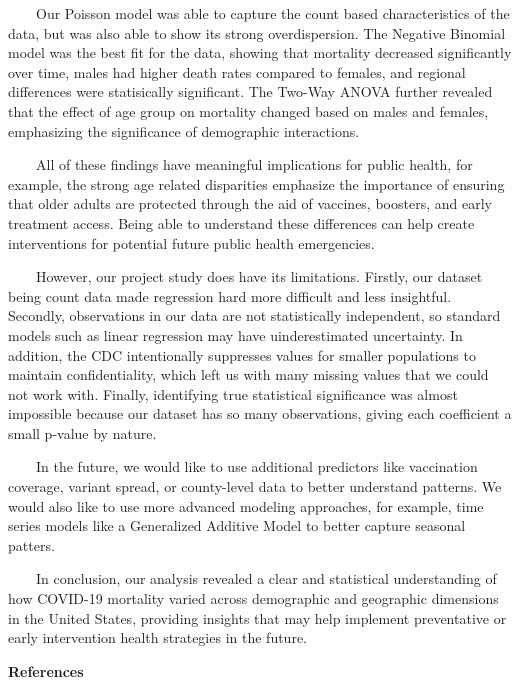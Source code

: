 \documentclass[
]{article}
\begin{document}
~~~~Our Poisson model was able to capture the count based
characteristics of the data, but was also able to show its strong
overdispersion. The Negative Binomial model was the best fit for the
data, showing that mortality decreased significantly over time, males
had higher death rates compared to females, and regional differences
were statisically significant. The Two-Way ANOVA further revealed that
the effect of age group on mortality changed based on males and females,
emphasizing the significance of demographic interactions.

~~~~All of these findings have meaningful implications for public
health, for example, the strong age related disparities emphasize the
importance of ensuring that older adults are protected through the aid
of vaccines, boosters, and early treatment access. Being able to
understand these differences can help create interventions for potential
future public health emergencies.

~~~~However, our project study does have its limitations. Firstly, our
dataset being count data made regression hard more difficult and less
insightful. Secondly, observations in our data are not statistically
independent, so standard models such as linear regression may have
uinderestimated uncertainty. In addition, the CDC intentionally
suppresses values for smaller populations to maintain confidentiality,
which left us with many missing values that we could not work with.
Finally, identifying true statistical significance was almost impossible
because our dataset has so many observations, giving each coefficient a
small p-value by nature.

~~~~In the future, we would like to use additional predictors like
vaccination coverage, variant spread, or county-level data to better
understand patterns. We would also like to use more advanced modeling
approaches, for example, time series models like a Generalized Additive
Model to better capture seasonal patters.

~~~~In conclusion, our analysis revealed a clear and statistical
understanding of how COVID-19 mortality varied across demographic and
geographic dimensions in the United States, providing insights that may
help implement preventative or early intervention health strategies in
the future.

\newpage

\begin{center}
\textbf{\Large References}
\end{center}
\end{document}
